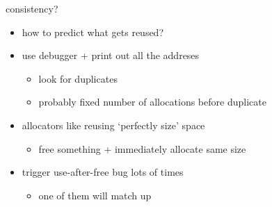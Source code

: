 \begin{frame}{consistency?}
    \begin{itemize}
    \item how to predict what gets reused?
    \vspace{.5cm}
    \item use debugger + print out all the addreses
        \begin{itemize}
        \item look for duplicates
        \item probably fixed number of allocations before duplicate
        \end{itemize}
    \item allocators like reusing `perfectly size' space
        \begin{itemize}
        \item free something + immediately allocate same size
        \end{itemize}
    \item trigger use-after-free bug lots of times
        \begin{itemize}
        \item one of them will match up
        \end{itemize}
    \end{itemize}
\end{frame}
